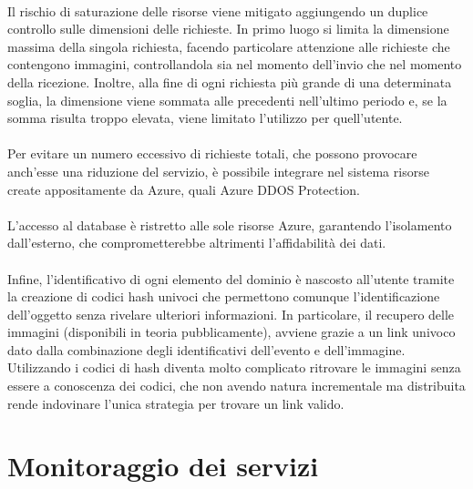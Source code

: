 \\
Il rischio di saturazione delle risorse viene mitigato
aggiungendo un duplice controllo sulle dimensioni delle richieste.
In primo luogo si limita la dimensione massima della singola richiesta,
facendo particolare attenzione alle richieste che contengono immagini,
controllandola sia nel momento dell'invio che nel momento della ricezione.
Inoltre, alla fine di ogni richiesta più grande di una determinata soglia,
la dimensione viene sommata alle precedenti nell'ultimo periodo e,
se la somma risulta troppo elevata, viene limitato l'utilizzo per quell'utente.\\
\\
Per evitare un numero eccessivo di richieste totali,
che possono provocare anch'esse una riduzione del servizio,
è possibile integrare nel sistema risorse create appositamente da Azure,
quali Azure DDOS Protection.\\
\\
L’accesso al database è ristretto alle sole risorse Azure,
garantendo l’isolamento dall’esterno,
che comprometterebbe altrimenti l’affidabilità dei dati.\\
\\
Infine, l’identificativo di ogni elemento del dominio è nascosto all’utente
tramite la creazione di codici hash univoci
che permettono comunque l'identificazione dell'oggetto senza rivelare ulteriori informazioni.
In particolare, il recupero delle immagini (disponibili in teoria pubblicamente),
avviene grazie a un link univoco dato dalla combinazione degli identificativi dell'evento e dell'immagine.
Utilizzando i codici di hash diventa molto complicato ritrovare le immagini
senza essere a conoscenza dei codici,
che non avendo natura incrementale ma distribuita rende
indovinare l'unica strategia per trovare un link valido.


\section{Monitoraggio dei servizi}

